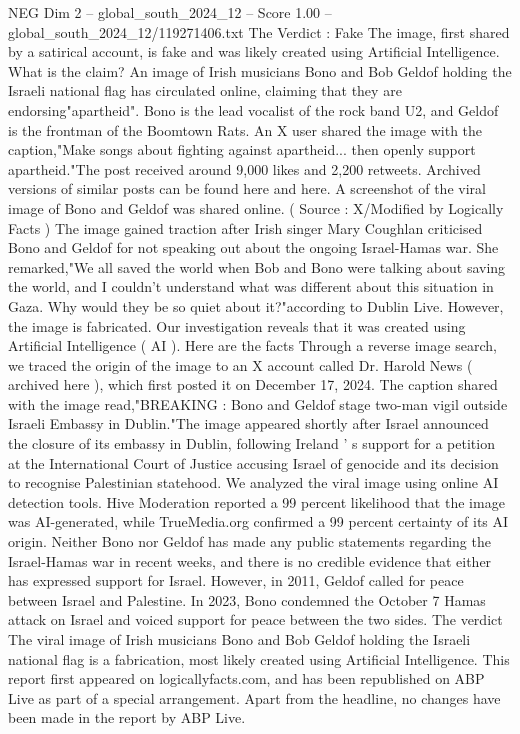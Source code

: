 \begin{textsample}{NEG Dim 2 – global\_south\_2024\_12 – Score 1.00 – global\_south\_2024\_12/119271406.txt}  \label{ex:f2_neg_237}
The Verdict : Fake The image, first shared by a satirical account, is fake and was likely created using Artificial Intelligence.
What is the claim?
An image of Irish musicians Bono and Bob Geldof holding the Israeli national flag has circulated online, claiming that they are endorsing"apartheid".
Bono is the lead vocalist of the rock band U2, and Geldof is the frontman of the Boomtown Rats.
An X user shared the image with the caption,"Make songs about fighting against apartheid... then openly support apartheid."The post received around 9,000 likes and 2,200 retweets.
Archived versions of similar posts can be found here and here.
A screenshot of the viral image of Bono and Geldof was shared online. ( Source : X/Modified by Logically Facts ) The image gained traction after Irish singer Mary Coughlan criticised Bono and Geldof for not speaking out about the ongoing Israel-Hamas war.
She remarked,"We all saved the world when Bob and Bono were talking about saving the world, and I couldn't understand what was different about this situation in Gaza.
Why would they be so quiet about it?"according to Dublin Live.
However, the image is fabricated.
Our investigation reveals that it was created using Artificial Intelligence ( AI ).
Here are the facts Through a reverse image search, we traced the origin of the image to an X account called Dr.
Harold News ( archived here ), which first posted it on December 17, 2024.
The caption shared with the image read,"BREAKING : Bono and Geldof stage two-man vigil outside Israeli Embassy in Dublin."The image appeared shortly after Israel announced the closure of its embassy in Dublin, following Ireland ' s support for a petition at the International Court of Justice accusing Israel of genocide and its decision to recognise Palestinian statehood.
We analyzed the viral image using online AI detection tools.
Hive Moderation reported a 99 percent likelihood that the image was AI-generated, while TrueMedia.org confirmed a 99 percent certainty of its AI origin.
Neither Bono nor Geldof has made any public statements regarding the Israel-Hamas war in recent weeks, and there is no credible evidence that either has expressed support for Israel.
However, in 2011, Geldof called for peace between Israel and Palestine.
In 2023, Bono condemned the October 7 Hamas attack on Israel and voiced support for peace between the two sides.
The verdict The viral image of Irish musicians Bono and Bob Geldof holding the Israeli national flag is a fabrication, most likely created using Artificial Intelligence.
This report first appeared on logicallyfacts.com, and has been republished on ABP Live as part of a special arrangement.
Apart from the headline, no changes have been made in the report by ABP Live.

\end{textsample}
